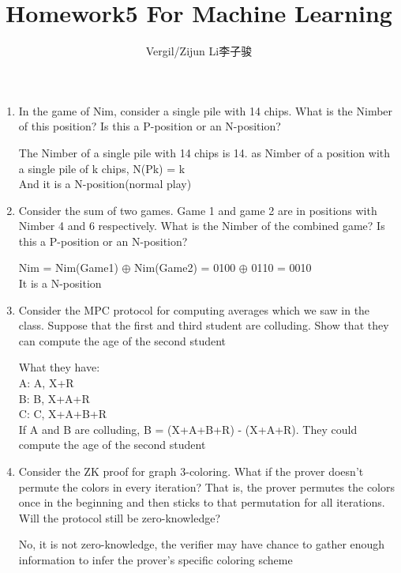\documentclass[a4paper]{article}
\author{Vergil/Zijun Li李子骏}
\title{Homework5 For Machine Learning}
\date{\vspace{-5ex}}
\begin{document}
\maketitle

\bf\begin{enumerate}

    \item In the game of Nim, consider a single pile with 14 chips. What is the Nimber of this position? Is
    this a P-position or an N-position?

    {\normalfont The Nimber of a single pile with 14 chips is 14. as Nimber of a position with a single pile of
    k chips, N(Pk) = k\\
    And it is a N-position(normal play)}

    \item Consider the sum of two games. Game 1 and game 2 are in positions with Nimber 4 and 6
    respectively. What is the Nimber of the combined game? Is this a P-position or an N-position?

    {\normalfont Nim = Nim(Game1) $\oplus$ Nim(Game2) = 0100 $\oplus$ 0110 = 0010\\
    It is a N-position}

    \item   Consider the MPC protocol for computing averages which we saw in the class. Suppose that
    the first and third student are colluding. Show that they can compute the age of the second
    student

    {\normalfont 
    What they have:\\
    A: A, X+R\\
    B: B, X+A+R\\
    C: C, X+A+B+R\\
    If A and B are colluding, B = (X+A+B+R) - (X+A+R). They could compute the age of the second student}

    \item  Consider the ZK proof for graph 3-coloring. What if the prover doesn't permute the colors in
    every iteration? That is, the prover permutes the colors once in the beginning and then sticks to
    that permutation for all iterations. Will the protocol still be zero-knowledge?

    {\normalfont No, it is not zero-knowledge, the verifier may have chance to gather enough information to infer the prover's specific coloring scheme}

\end{enumerate}
\end{document}
